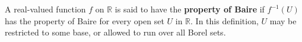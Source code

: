 A real-valued function $f$ on $\mathbb{R}$ is said to have the \textbf{property of Baire} if $f^{-1}(U)$ has the property of Baire for every open set $U$ in $\mathbb{R}$. In this definition, $U$ may be restricted to some base, or allowed to run over all Borel sets.
